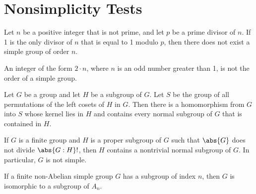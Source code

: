 \section{Nonsimplicity Tests}

\begin{theorem}
	Let $n$ be a positive integer that is not prime, and let $p$ be a prime divisor of $n$. If 1 is the only divisor of $n$ that is equal to 1 modulo $p$, then there does not exist a simple group of order $n$.
\end{theorem}

\begin{theorem}
	An integer of the form $2 \cdot n$, where $n$ is an odd number greater than 1, is not the order of a simple group.
\end{theorem}

\begin{theorem}
	Let $G$ be a group and let $H$ be a subgroup of $G$. Let $S$ be the group of all permutations of the left cosets of $H$ in $G$. Then there is a homomorphism from $G$ into $S$ whose kernel lies in $H$ and contains every normal subgroup of $G$ that is contained in $H$.
\end{theorem}

\begin{corollary}
	If $G$ is a finite group and $H$ is a proper subgroup of $G$ such that $\abs{G}$ does not divide $\abs{G:H}!$, then $H$ contains a nontrivial normal subgroup of $G$. In particular, $G$ is not simple.
\end{corollary}

\begin{corollary}
	If a finite non-Abelian simple group $G$ has a subgroup of index $n$, then $G$ is isomorphic to a subgroup of $A_n$.
\end{corollary}
